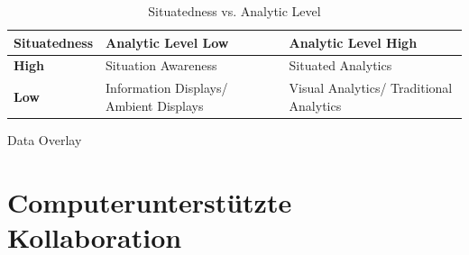 

\begin{table}[htbp]
\caption{Situatedness vs. Analytic Level}
	\begin{center}
		\begin{tabular}{|l|l|l|}
		\hline
		\textbf{Situatedness}& \textbf{Analytic Level Low} & \textbf{Analytic Level High}\\
		\hline
		\textbf{High } & Situation Awareness & Situated Analytics \\
		\hline
		\textbf{Low} & Information Displays/ Ambient Displays & Visual Analytics/ Traditional Analytics \\
		\hline
		\end{tabular}
	\end{center}
	\label{tab:categorycscw}
\end{table}







Data Overlay 




% 


\section{Computerunterstützte Kollaboration}


